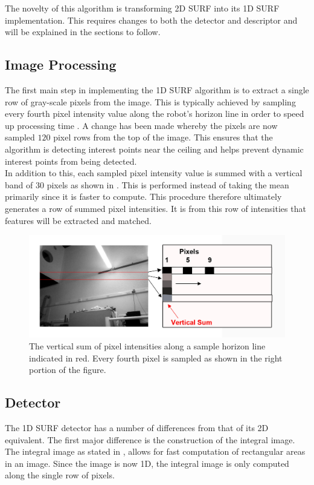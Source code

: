 The novelty of this algorithm is transforming 2D SURF into its 1D SURF implementation. This requires changes to both the detector and descriptor and will be explained in the sections to follow.\\

\subsection{Image Processing}
\label{sec:imageProcessing}
The first main step in implementing the 1D SURF algorithm is to extract a single row of gray-scale pixels from the image. This is typically achieved by sampling every fourth pixel intensity value along the robot's horizon line \citep{Bhuman} in order to speed up processing time \citep{Anderson}. A change has been made whereby the pixels are now sampled $120$ pixel rows from the top of the image. This ensures that the algorithm is detecting interest points near the ceiling and helps prevent dynamic interest points from being detected.\\

In addition to this, each sampled pixel intensity value is summed with a vertical band of $30$ pixels as shown in . This is performed instead of taking the mean primarily since it is faster to compute. This procedure therefore ultimately generates a row of summed pixel intensities. It is from this row of intensities that features will be extracted and matched.\\

\begin{figure}[h!] 
  \centering
    \includegraphics[width=1.0\textwidth]{../Drawings/methods/horizon.jpg}
    \caption{The vertical sum of pixel intensities along a sample horizon line indicated in red. Every fourth pixel is sampled as shown in the right portion of the figure. }
    \label{fig:rows}
\end{figure}

\subsection{Detector}
\label{sec:1dsurfDetect}
The 1D SURF detector has a number of differences from that of its 2D equivalent. The first major difference is the construction of the integral image. The integral image as stated in , allows for fast computation of rectangular areas in an image. Since the image is now 1D, the integral image is only computed along the single row of pixels.\\ 

